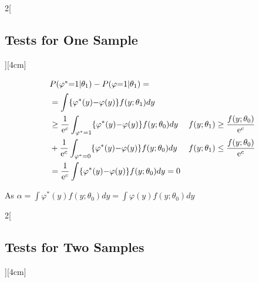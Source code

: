 \documentclass[8pt]{extarticle}
\begin{document}
\begin{multicols}{2}[\subsection{Tests for One Sample}][4cm]
\begin{Proof}
\begin{align*}
\intertext{$P(\varphi^* {=} 1|\theta_1) - P(\varphi {=} 1|\theta_1) = $}
&= \int \{\varphi^*(y) {-} \varphi(y)\} f(y;\theta_1)dy\\
&\geq \frac{1}{\mathrm{e}^c} \int_{\varphi^*{=}1} \{\varphi^*(y) {-} \varphi(y)\}f(y;\theta_0)dy & f(y;\theta_1) \geq \frac{f(y;\theta_0)}{\mathrm{e}^c} \\
&+ \frac{1}{\mathrm{e}^c} \int_{\varphi^*{=}0} \{\varphi^*(y) {-} \varphi(y)\}f(y;\theta_0)dy & f(y;\theta_1) \leq \frac{f(y;\theta_0)}{\mathrm{e}^c} \\
&= \frac{1}{\mathrm{e}^c} \int \{\varphi^*(y) {-} \varphi(y)\}f(y;\theta_0)dy = 0
\end{align*}

\noindent As $\alpha = \int \varphi^*(y)f(y;\theta_0)dy = \int \varphi(y)f(y;\theta_0)dy$
\end{Proof}


\end{multicols}

\begin{multicols}{2}[\subsection{Tests for Two Samples}][4cm]

\end{multicols}
\end{document}
